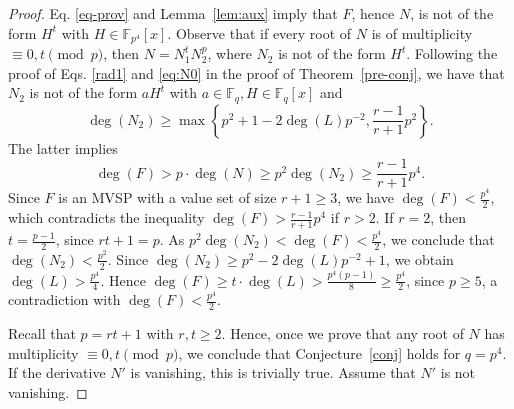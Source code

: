 \documentclass[10pt,a4paper]{amsart}
\newcommand{\F}{\mathbb{F}}
\begin{document}
\begin{proof}
Eq. \eqref{eq-prov} and  Lemma~\ref{lem:aux} imply  that $F$, hence $N$, is not of the form $H^t$ with $H\in \F_{p^4}[x]$. 
Observe that  if  every root of $N$ is of multiplicity $\equiv 0, t\pmod p$, then $N=N_1^tN_2^p$, where $N_2$ is not of the form $H^t$. Following the proof of  Eqs. \eqref{rad1} and 
\eqref{eq:N0}   in the proof of Theorem~\ref{pre-conj}, we have that  $N_2$ is not of the form $aH^t$ with $a\in \F_q, H\in \F_q[x]$ and $$\deg(N_2)\ge \max\left\{p^2+1-2\deg(L)p^{-2}, \frac{r-1}{r+1}p^2\right\}.$$
The latter implies 
 $$\deg(F)>p\cdot \deg(N)\ge p^2\deg(N_2)\ge \frac{r-1}{r+1}p^4.$$ 
  Since $F$ is an MVSP with a value set of size $r+1\ge 3$, we have $\deg(F)<\frac{p^4}{2}$, which  contradicts the inequality  $\deg(F)>\frac{r-1}{r+1}p^4$ if $r>2$. If $r=2$, then $t=\frac{p-1}{2}$, since $rt+1=p$. As $p^2\deg(N_2)<\deg(F)<\frac{p^4}{2}$, we conclude that $\deg(N_2)<\frac{p^2}{2}$. Since  $\deg(N_2)\ge p^2-2\deg(L)p^{-2}+1$, we obtain $\deg(L)>\frac{p^4}{4}$. Hence $\deg(F)\ge t\cdot \deg(L)>\frac{p^4(p-1)}{8}\ge \frac{p^4}{2}$, since $p\ge 5$, a contradiction with  $\deg(F)<\frac{p^4}{2}$.  
  
  Recall that $p=rt+1$ with $r, t\ge 2$.  Hence,  once we prove that any root of $N$ has multiplicity $\equiv 0, t\pmod p$, we conclude that Conjecture~\ref{conj} holds for $q=p^4$.  If the derivative $N'$ is vanishing, this is trivially true. Assume that $N'$ is not vanishing.


\end{proof}
\end{document}
